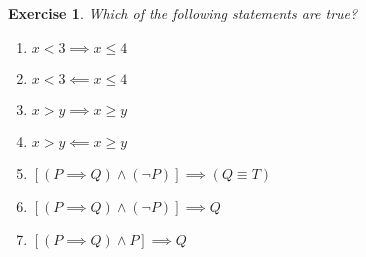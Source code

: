 \documentclass{article}[12pt]
\newtheorem{exercise}{Exercise}[section]
\begin{document}
        
        \newpage
        
        \begin{exercise}
            Which of the following statements are true?
            \begin{multicols}{2}
                \begin{enumerate}
                    \item
                    $x < 3 \implies x \le 4$
                    
                    \item
                    $x < 3 \impliedby x \le 4$
                    
                    \item
                    $x > y \implies x \ge y$
                    
                    \item
                    $x > y \impliedby x \ge y$
                    
                    \item
                    $[(P \implies Q) \land (\neg P)] \implies  (Q \equiv T)$
                    
                    \item
                    $[(P \implies Q) \land (\neg P)] \implies  Q$
                    
                    \item
                    $[(P \implies Q) \land P] \implies Q$
                    
                    
                    
                    
                \end{enumerate}
            \end{multicols}
        \end{exercise}
    
\end{document}
